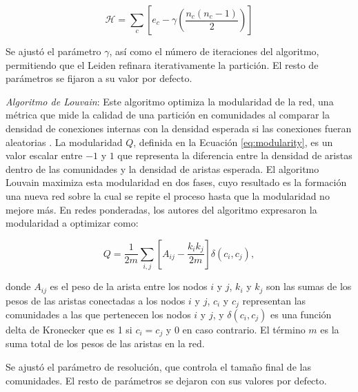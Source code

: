 \begin{equation}
	\label{eq:cpm}
	\mathcal{H} = \sum_{c} \left[ e_c - \gamma \left( \frac{n_c (n_c - 1)}{2} \right) \right]
\end{equation}

\noindent Se ajustó el parámetro \(\gamma\), así como el número de iteraciones del algoritmo, permitiendo que el Leiden refinara iterativamente la partición. El resto de parámetros se fijaron a su valor por defecto. 


\textit{Algoritmo de Louvain}: Este algoritmo optimiza la modularidad de la red, una métrica que mide la calidad de una partición en comunidades al comparar la densidad de conexiones internas con la densidad esperada si las conexiones fueran aleatorias \cite{Blondel2008Louvain}. La modularidad \( Q \), definida en la Ecuación \ref{eq:modularity}, es un valor escalar entre \(-1\) y \(1\) que representa la diferencia entre la densidad de aristas dentro de las comunidades y la densidad de aristas esperada. El algoritmo Louvain maximiza esta modularidad en dos fases, cuyo resultado es la formación una nueva red sobre la cual se repite el proceso hasta que la modularidad no mejore más. En redes ponderadas, los autores del algoritmo expresaron la modularidad a optimizar como:

\begin{equation}
	\label{eq:modularity}
	Q = \frac{1}{2m} \sum_{i,j} \left[ A_{ij} - \frac{k_i k_j}{2m} \right] \delta(c_i, c_j),
\end{equation}

\noindent donde \( A_{ij} \) es el peso de la arista entre los nodos \( i \) y \( j \), \( k_i \) y \( k_j \) son las sumas de los pesos de las aristas conectadas a los nodos \( i \) y \( j \), \( c_i \) y \( c_j \) representan las comunidades a las que pertenecen los nodos \( i \) y \( j \), y \( \delta(c_i, c_j) \) es una función delta de Kronecker que es 1 si \( c_i = c_j \) y 0 en caso contrario. El término \( m \) es la suma total de los pesos de las aristas en la red.

\noindent Se ajustó el parámetro de resolución, que controla el tamaño final de las comunidades. El resto de parámetros se dejaron con sus valores por defecto.

